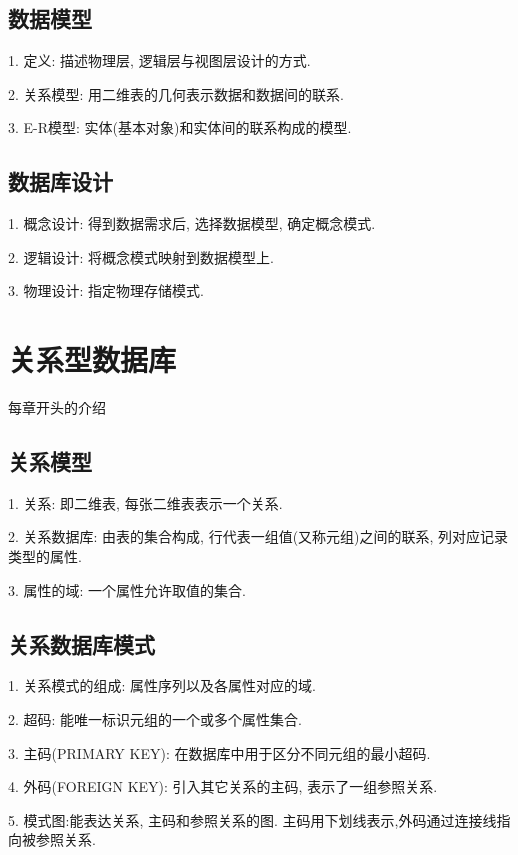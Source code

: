 \subsection{数据模型}

1. 定义: 描述物理层, 逻辑层与视图层设计的方式.

2. 关系模型: 用二维表的几何表示数据和数据间的联系.

3. E-R模型: 实体(基本对象)和实体间的联系构成的模型.

\subsection{数据库设计}

1. 概念设计: 得到数据需求后, 选择数据模型, 确定概念模式.

2. 逻辑设计: 将概念模式映射到数据模型上.

3. 物理设计: 指定物理存储模式.

\section{关系型数据库}

\begin{tcolorbox}[colback=red!5,colframe=red!75!black]
    每章开头的介绍
\end{tcolorbox}

\subsection{关系模型}

1. 关系: 即二维表, 每张二维表表示一个关系.

2. 关系数据库: 由表的集合构成, 行代表一组值(又称元组)之间的联系, 列对应记录类型的属性.

3. 属性的域: 一个属性允许取值的集合.

\subsection{关系数据库模式}

1. 关系模式的组成: 属性序列以及各属性对应的域.

2. 超码: 能唯一标识元组的一个或多个属性集合.

3. 主码(PRIMARY KEY): 在数据库中用于区分不同元组的最小超码.

4. 外码(FOREIGN KEY): 引入其它关系的主码, 表示了一组参照关系.

5. 模式图:能表达关系, 主码和参照关系的图. 主码用下划线表示,外码通过连接线指向被参照关系.

